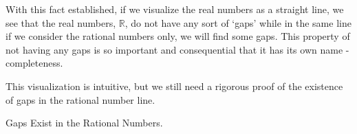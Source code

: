 \noindent With this fact established, if we visualize the real numbers as a straight line, we see that the real numbers, $\mathbb{R}$, do not have any sort of `gaps' while in the same line if we consider the rational numbers only, we will find some gaps. This property of not having any gaps is so important and consequential that it has its own name - completeness.
\begin{center}
\end{center}
\noindent This visualization is intuitive, but we still need a rigorous proof of the existence of gaps in the rational number line.
\begin{Example}\label{gaps_in_rationals}
    Gaps Exist in the Rational Numbers.
\end{Example}
